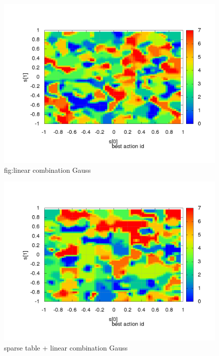 \begin{figure}[!htb]
\centering
\includegraphics[scale=.4]{../../results_q_learning/map_1/function_type_2/iterations_10/action_best_value_log_surface.png}
\caption{fig:linear combination Gauss}
\end{figure}




\begin{figure}[!htb]
\includegraphics[scale=.4]{../../results_q_learning/map_1/function_type_3/iterations_10/action_best_value_log_surface.png}
\caption{sparse table + linear combination Gauss}
\end{figure}


